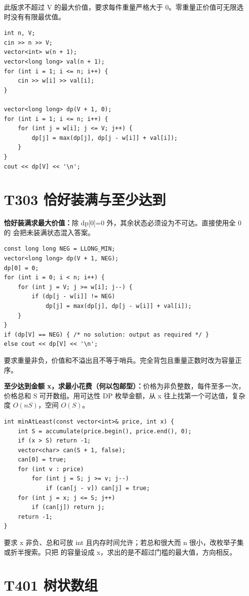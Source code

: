 此版求不超过 V 的最大价值，要求每件重量严格大于 0。零重量正价值可无限选时没有有限最优值。

\begin{lstlisting}
int n, V;
cin >> n >> V;
vector<int> w(n + 1);
vector<long long> val(n + 1);
for (int i = 1; i <= n; i++) {
    cin >> w[i] >> val[i];
}

vector<long long> dp(V + 1, 0);
for (int i = 1; i <= n; i++) {
    for (int j = w[i]; j <= V; j++) {
        dp[j] = max(dp[j], dp[j - w[i]] + val[i]);
    }
}
cout << dp[V] << '\n';
\end{lstlisting}


\section{T303 恰好装满与至少达到}\label{sec:09-26}\label{tpl:303}
\textbf{恰好装满求最大价值：}除 dp[0]=0 外，其余状态必须设为不可达。直接使用全 0 的  会把未装满状态混入答案。
\begin{lstlisting}
const long long NEG = LLONG_MIN;
vector<long long> dp(V + 1, NEG);
dp[0] = 0;
for (int i = 0; i < n; i++) {
    for (int j = V; j >= w[i]; j--) {
        if (dp[j - w[i]] != NEG)
            dp[j] = max(dp[j], dp[j - w[i]] + val[i]);
    }
}
if (dp[V] == NEG) { /* no solution: output as required */ }
else cout << dp[V] << '\n';
\end{lstlisting}
要求重量非负，价值和不溢出且不等于哨兵。完全背包且重量正数时改为容量正序。

\textbf{至少达到金额 x，求最小花费（何以包邮型）：}价格为非负整数，每件至多一次，价格总和 S 可开数组。用可达性 DP 枚举金额，从 x 往上找第一个可达值，复杂度 $O(nS)$，空间 $O(S)$。
\begin{lstlisting}
int minAtLeast(const vector<int>& price, int x) {
    int S = accumulate(price.begin(), price.end(), 0);
    if (x > S) return -1;
    vector<char> can(S + 1, false);
    can[0] = true;
    for (int v : price)
        for (int j = S; j >= v; j--)
            if (can[j - v]) can[j] = true;
    for (int j = x; j <= S; j++)
        if (can[j]) return j;
    return -1;
}
\end{lstlisting}
要求 x 非负、总和可放 int 且内存时间允许；若总和很大而 n 很小，改枚举子集或折半搜索。只把  的容量设成 x，求出的是不超过门槛的最大值，方向相反。

\section{T401 树状数组}\label{sec:09-27}\label{tpl:401}

